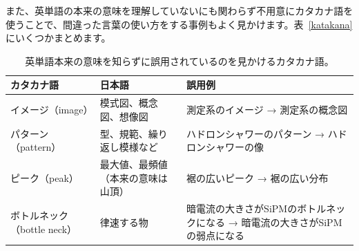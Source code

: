 また、英単語の本来の意味を理解していないにも関わらず不用意にカタカナ語を使うことで、間違った言葉の使い方をする事例もよく見かけます。表~\ref{katakana}にいくつかまとめます。

\begin{landscape}
  \begin{longtable}{lll}
  \caption{英単語本来の意味を知らずに誤用されているのを見かけるカタカナ語。} \\
    \hline
    カタカナ語 & 日本語 & 誤用例 \\
    \hline
    イメージ（image） & 模式図、概念図、想像図 & 測定系のイメージ → 測定系の概念図 \\
    パターン（pattern） & 型、規範、繰り返し模様など & ハドロンシャワーのパターン → ハドロンシャワーの像 \\
    ピーク（peak） & 最大値、最頻値（本来の意味は山頂） & 裾の広いピーク → 裾の広い分布 \\
    ボトルネック（bottle neck） & 律速する物 & 暗電流の大きさがSiPMのボトルネックになる → 暗電流の大きさがSiPMの弱点になる \\
    \hline
  \end{longtable}
  \label{katakana}
\end{landscape}


